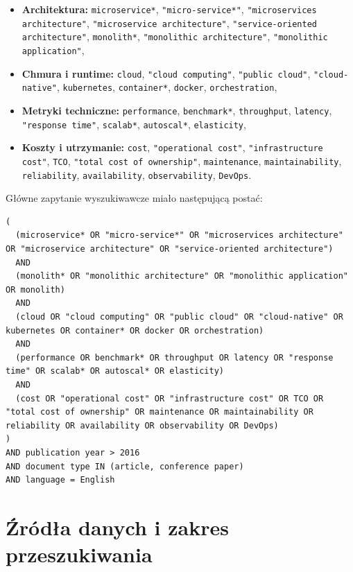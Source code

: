 \begin{itemize}
    \item \textbf{Architektura:} \texttt{microservice*}, \texttt{"micro-service*"}, \texttt{"microservices architecture"}, \texttt{"microservice architecture"}, \texttt{"service-oriented architecture"}, \texttt{monolith*}, \texttt{"monolithic architecture"}, \texttt{"monolithic application"},
    \item \textbf{Chmura i runtime:} \texttt{cloud}, \texttt{"cloud computing"}, \texttt{"public cloud"}, \texttt{"cloud-native"}, \texttt{kubernetes}, \texttt{container*}, \texttt{docker}, \texttt{orchestration},
    \item \textbf{Metryki techniczne:} \texttt{performance}, \texttt{benchmark*}, \texttt{throughput}, \texttt{latency}, \texttt{"response time"}, \texttt{scalab*}, \texttt{autoscal*}, \texttt{elasticity},
    \item \textbf{Koszty i utrzymanie:} \texttt{cost}, \texttt{"operational cost"}, \texttt{"infrastructure cost"}, \texttt{TCO}, \texttt{"total cost of ownership"}, \texttt{maintenance}, \texttt{maintainability}, \texttt{reliability}, \texttt{availability}, \texttt{observability}, \texttt{DevOps}.
\end{itemize}

Główne zapytanie wyszukiwawcze miało następującą postać:
\begin{listing}[ht]
    \begin{verbatim}
(
  (microservice* OR "micro-service*" OR "microservices architecture" OR "microservice architecture" OR "service-oriented architecture")
  AND
  (monolith* OR "monolithic architecture" OR "monolithic application" OR monolith)
  AND
  (cloud OR "cloud computing" OR "public cloud" OR "cloud-native" OR kubernetes OR container* OR docker OR orchestration)
  AND
  (performance OR benchmark* OR throughput OR latency OR "response time" OR scalab* OR autoscal* OR elasticity)
  AND
  (cost OR "operational cost" OR "infrastructure cost" OR TCO OR "total cost of ownership" OR maintenance OR maintainability OR reliability OR availability OR observability OR DevOps)
)
AND publication year > 2016
AND document type IN (article, conference paper)
AND language = English
    \end{verbatim}
    \caption{Zapytanie do wyszukiwania artykułów}
    \label{lst:slr-search-sequence}
\end{listing}

\section{Źródła danych i zakres przeszukiwania}

